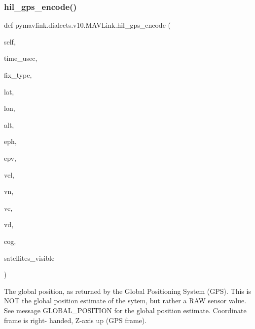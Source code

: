 \begin{DoxyVerb}
\begin{DoxyVerb}
\subsubsection{\texorpdfstring{hil\+\_\+gps\+\_\+encode()}{hil\_gps\_encode()}}
{\footnotesize\ttfamily def pymavlink.\+dialects.\+v10.\+M\+A\+V\+Link.\+hil\+\_\+gps\+\_\+encode (\begin{DoxyParamCaption}\item[{}]{self,  }\item[{}]{time\+\_\+usec,  }\item[{}]{fix\+\_\+type,  }\item[{}]{lat,  }\item[{}]{lon,  }\item[{}]{alt,  }\item[{}]{eph,  }\item[{}]{epv,  }\item[{}]{vel,  }\item[{}]{vn,  }\item[{}]{ve,  }\item[{}]{vd,  }\item[{}]{cog,  }\item[{}]{satellites\+\_\+visible }\end{DoxyParamCaption})}

\begin{DoxyVerb}The global position, as returned by the Global Positioning System
(GPS). This is                  NOT the global
position estimate of the sytem, but rather a RAW
sensor value. See message GLOBAL_POSITION for the
global position estimate. Coordinate frame is right-
handed, Z-axis up (GPS frame).


\end{DoxyVerb}
\end{DoxyVerb}
\end{DoxyVerb}
